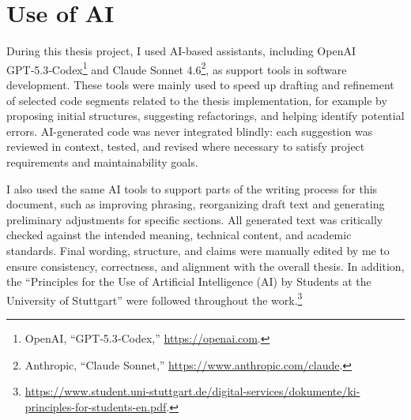 \chapter{Use of AI}\label{sec:use_of_ai}

During this thesis project, I used AI-based assistants, including OpenAI GPT‑5.3‑Codex\footnote{OpenAI, ``GPT‑5.3‑Codex,'' \url{https://openai.com}.} and Claude Sonnet 4.6\footnote{Anthropic, ``Claude Sonnet,'' \url{https://www.anthropic.com/claude}.}, as support tools in software development. These tools were mainly used to speed up drafting and refinement of selected code segments related to the thesis implementation, for example by proposing initial structures, suggesting refactorings, and helping identify potential errors. AI-generated code was never integrated blindly: each suggestion was reviewed in context, tested, and revised where necessary to satisfy project requirements and maintainability goals.

I also used the same AI tools to support parts of the writing process for this document, such as improving phrasing, reorganizing draft text and generating preliminary adjustments for specific sections. All generated text was critically checked against the intended meaning, technical content, and academic standards. Final wording, structure, and claims were manually edited by me to ensure consistency, correctness, and alignment with the overall thesis. In addition, the ``Principles for the Use of Artificial Intelligence (AI) by Students at the University of Stuttgart'' were followed throughout the work.\footnote{\url{https://www.student.uni-stuttgart.de/digital-services/dokumente/ki-principles-for-students-en.pdf}.}
